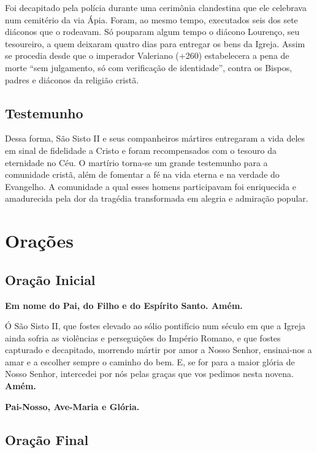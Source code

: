 \documentclass[a4paper,12pt]{extarticle} \usepackage[utf8]{inputenc}
\begin{document}
Foi decapitado pela polícia durante uma cerimônia clandestina que ele celebrava num cemitério da via Ápia. Foram, ao mesmo tempo, executados seis dos sete diáconos que o rodeavam. Só pouparam algum tempo o diácono Lourenço, seu tesoureiro, a quem deixaram quatro dias para entregar os bens da Igreja. Assim se procedia desde que o imperador Valeriano (+260) estabelecera a pena de morte “sem julgamento, só com verificação de identidade”, contra os Bispos, padres e diáconos da religião cristã.

\subsection{Testemunho}

Dessa forma, São Sisto II e seus companheiros mártires entregaram a vida deles em sinal de fidelidade a Cristo e foram recompensados com o tesouro da eternidade no Céu. O martírio torna-se um grande testemunho para a comunidade cristã, além de fomentar a fé na vida eterna e na verdade do Evangelho. A comunidade a qual esses homens participavam foi enriquecida e amadurecida pela dor da tragédia transformada em alegria e admiração popular.


\newpage
\section{Orações}

\subsection{Oração Inicial} \label{oracao-inicial}

\textbf{Em nome do Pai, do Filho e do Espírito Santo. Amém.}

Ó São Sisto II, que fostes elevado ao sólio pontifício num século em que a Igreja ainda sofria as violências e perseguições do Império Romano, e que fostes capturado e decapitado, morrendo mártir por amor a Nosso Senhor,  
ensinai-nos a amar e a escolher sempre o caminho do bem.  
E, se for para a maior glória de Nosso Senhor, intercedei por nós pelas graças que vos pedimos nesta novena.  \textbf{Amém.}

\begin{center}
  \large
  \textbf{Pai-Nosso, Ave-Maria e Glória.}
\end{center}


\subsection{Oração Final} \label{oracao-final}
\end{document}
